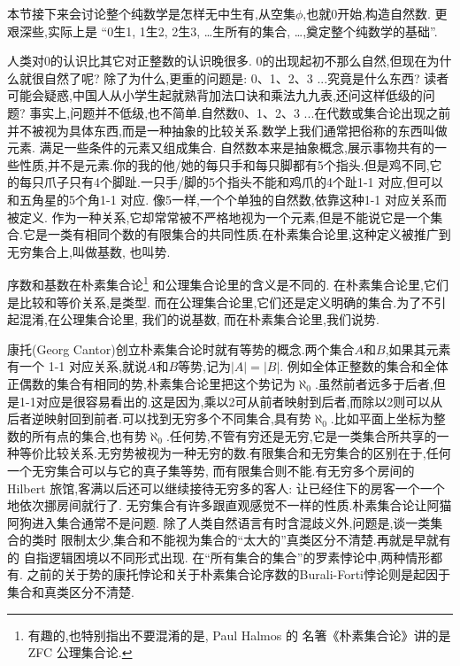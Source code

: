 \documentclass[main.tex]{subfiles}
\begin{document}
 {\small
 本节接下来会讨论整个纯数学是怎样无中生有,从空集$\phi$,也就0开始,构造自然数.
更艰深些,实际上是 “0生1, 1生2, 2生3, \dots 生所有的集合, \dots,奠定整个纯数学的基础”.

人类对0的认识比其它对正整数的认识晚很多. 0的出现起初不那么自然,但现在为什么就很自然了呢?
除了为什么,更重的问题是: 0、1、2、3 ...究竟是什么东西?
读者可能会疑惑,中国人从小学生起就熟背加法口诀和乘法九九表,还问这样低级的问题?
事实上,问题并不低级,也不简单.自然数0、1、2、3 ...在代数或集合论出现之前并不被视为具体东西,而是一种抽象的比较关系.数学上我们通常把俗称的东西叫做元素.
满足一些条件的元素又组成集合.
自然数本来是抽象概念,展示事物共有的一些性质,并不是元素.你的我的他/她的每只手和每只脚都有5个指头.但是鸡不同,它的每只爪子只有4个脚趾.一只手/脚的5个指头不能和鸡爪的4个趾1-1 对应,但可以和五角星的5个角1-1 对应.
像5一样,一个个单独的自然数,依靠这种1-1 对应关系而被定义.
作为一种关系,它却常常被不严格地视为一个元素,但是不能说它是一个集合.它是一类有相同个数的有限集合的共同性质.在朴素集合论里,这种定义被推广到无穷集合上,叫做基数, 也叫势.

序数和基数在朴素集合论\footnote{有趣的,也特别指出不要混淆的是, Paul Halmos 的
名箸《朴素集合论》\cite{HalmosP}讲的是ZFC 公理集合论.}
和公理集合论里的含义是不同的. 
在朴素集合论里,它们是比较和等价关系,是类型.
而在公理集合论里,它们还是定义明确的集合.为了不引起混淆,在公理集合论里,
我们的说基数,
而在朴素集合论里,我们说势.

康托(Georg Cantor)创立朴素集合论时就有等势的概念.两个集合$A$和$B$,如果其元素有一个 1-1 对应关系,就说$A$和$B$等势,记为$|A|=|B|$.
例如全体正整数的集合和全体正偶数的集合有相同的势,朴素集合论里把这个势记为$\aleph_0$.虽然前者远多于后者,但是1-1对应是很容易看出的.这是因为,乘以2可从前者映射到后者,而除以2则可以从后者逆映射回到前者.可以找到无穷多个不同集合,具有势$\aleph_0$.比如平面上坐标为整数的所有点的集合,也有势$\aleph_0$.任何势,不管有穷还是无穷,它是一类集合所共享的一种等价比较关系.无穷势被视为一种无穷的数.有限集合和无穷集合的区别在于,任何一个无穷集合可以与它的真子集等势, 而有限集合则不能.有无穷多个房间的Hilbert 旅馆,客满以后还可以继续接待无穷多的客人: 让已经住下的房客一个一个地依次挪房间就行了.
无穷集合有许多跟直观感觉不一样的性质.朴素集合论让阿猫阿狗进入集合通常不是问题.
除了人类自然语言有时含混歧义外,问题是,谈一类集合的类时
限制太少,集合和不能视为集合的“太大的”真类区分不清楚.再就是早就有的
自指逻辑困境以不同形式出现.
在“所有集合的集合”的罗素悖论中,两种情形都有.
之前的关于势的康托悖论和关于朴素集合论序数的Burali-Forti悖论则是起因于集合和真类区分不清楚.

}
\end{document}
